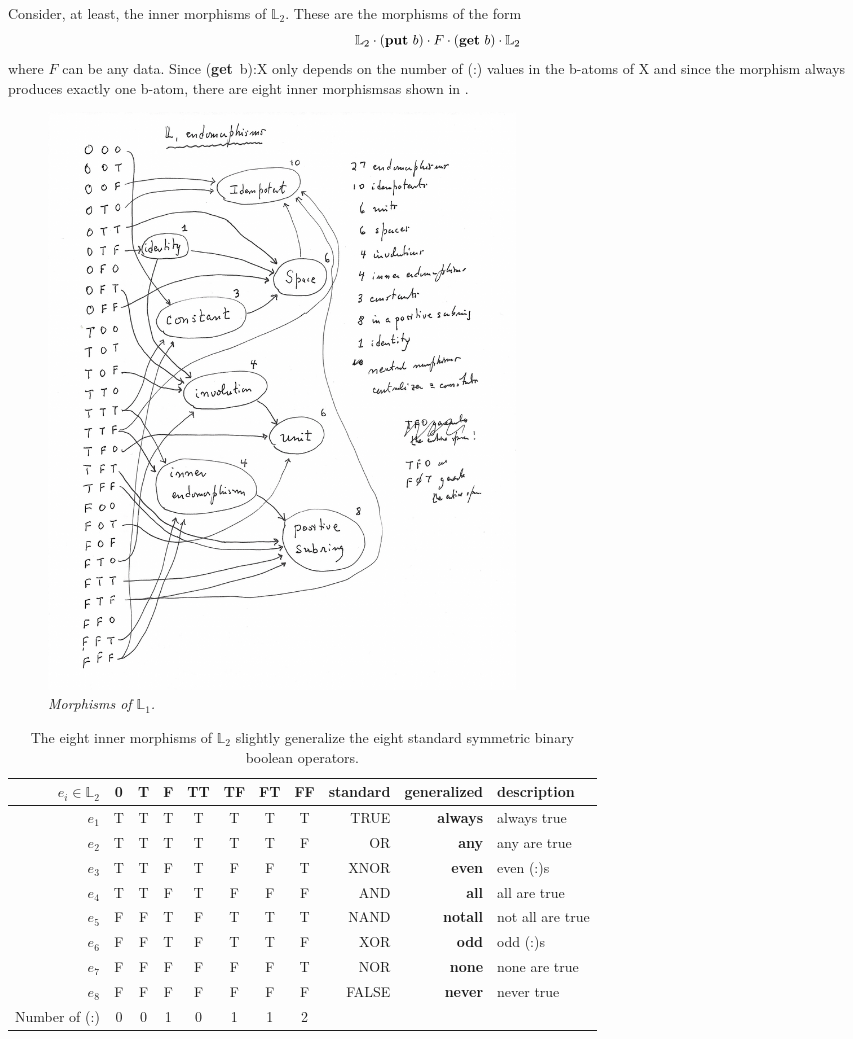 \documentclass[11pt]{article}
\begin{document}
    Consider, at least, the inner morphisms of ${\mathbb L}_2$.  These are the morphisms of the form
 \begin{equation}
 {\mathbb L}_2\cdot ({\bf put}\ b)\cdot F \cdot ({\bf get}\ b) \cdot {\mathbb L}_2 
 \end{equation}
 where $F$ can be any data.  Since ({\bf get}\ b):X only depends on the number of (:) values in the b-atoms of X and since the morphism always produces exactly one b-atom, 
 there are eight inner morphismsas shown in \cite{L2}.

\begin{figure}[h]
\centering
\includegraphics[width=0.6\textwidth]{L1.pdf}
\caption{{\it Morphisms of ${\mathbb L}_1$.}}
\end{figure}

\begin{table}
\caption{The eight inner morphisms of ${\mathbb L}_2$ slightly generalize the eight standard symmetric binary boolean operators.}
\centering 
\begin{tabular}{r c c c c c c c r r l}
\hline\hline
$e_i \in {\mathbb L}_2$ & 0 & T & F & TT & TF & FT & FF & standard & generalized & description \\ [0.5ex] 
\hline
$e_1$  & T & T & T & T & T & T & T & TRUE & {\bf always} & always true \\
$e_2$  & T & T & T & T & T & T & F & OR & {\bf any} & any are true \\
$e_3$  & T & T & F & T & F & F & T & XNOR & {\bf even} & even (:)s \\
$e_4$ & T & T & F & T & F & F & F & AND & {\bf all} & all are true \\
$e_5$ & F & F & T & F & T & T & T & NAND & {\bf notall} & not all are true \\
$e_6$ & F & F & T & F & T & T & F & XOR & {\bf odd} & odd (:)s \\
$e_7$ & F & F & F & F & F & F & T & NOR & {\bf none} & none are true  \\
$e_8$ & F & F & F & F & F & F & F & FALSE & {\bf never} & never true \\
\hline
Number of (:)   & 0 & 0 & 1 & 0 & 1 & 1 & 2 &  \\ 
\hline
\end{tabular}
\label{table:L2}
\end{table} 
\end{document}
